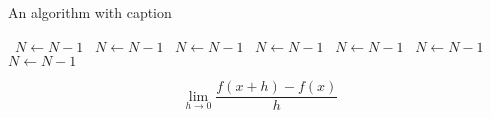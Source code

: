 \documentclass[a4paper]{article}
\begin{document}
\begin{algorithm}
\caption{An algorithm with caption}
\begin{algorithmic}
\    \State $N \gets N - 1$
\    \State $N \gets N - 1$
\    \State $N \gets N - 1$
\    \State $N \gets N - 1$
\    \State $N \gets N - 1$
\    \State $N \gets N - 1$
\    \State $N \gets N - 1$
\EndWhile
\end{algorithmic}
\end{algorithm}

\[\lim_{h \rightarrow 0 } \frac{f(x+h)-f(x)}{h}\]
\end{document}
